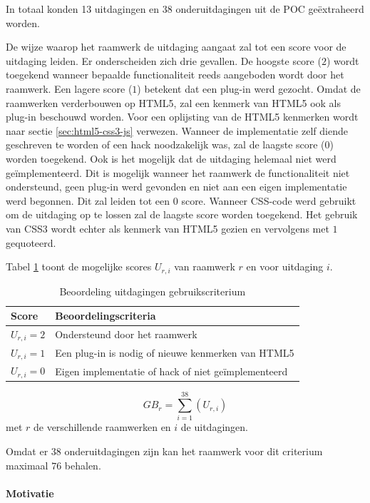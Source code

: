 In totaal konden 13 uitdagingen en 38 onderuitdagingen uit de POC geëxtraheerd worden.


De wijze waarop het raamwerk de uitdaging aangaat zal tot een score voor de uitdaging leiden.
Er onderscheiden zich drie gevallen.
De hoogste score ($2$) wordt toegekend wanneer bepaalde functionaliteit reeds aangeboden wordt door het raamwerk. 
Een lagere score ($1$) betekent dat een plug-in werd gezocht.
Omdat de raamwerken verderbouwen op HTML5, zal een kenmerk van HTML5 ook als plug-in beschouwd worden.
Voor een oplijsting van de HTML5 kenmerken wordt naar sectie \ref{sec:html5-css3-js} verwezen.
Wanneer de implementatie zelf diende geschreven te worden of een hack noodzakelijk was, zal de laagste score ($0$) worden toegekend.
Ook is het mogelijk  dat de uitdaging helemaal niet werd geïmplementeerd.
Dit is mogelijk wanneer het raamwerk de functionaliteit niet ondersteund,  geen plug-in werd gevonden en niet aan een eigen implementatie werd begonnen.
Dit zal leiden tot een $0$ score.
Wanneer CSS-code werd gebruikt om de uitdaging op te lossen zal de laagste score worden toegekend.
Het gebruik van CSS3 wordt echter als kenmerk van HTML5 gezien en vervolgens met $1$ gequoteerd.

Tabel \ref{tabel:scores-uitdagingen} toont de mogelijke scores $U_{r,i}$ van raamwerk $r$ en voor uitdaging $i$.
\begin{table}[h]	
  \centering
  \begin{tabular}{ll}
    \toprule
    \textbf{Score} & \textbf{Beoordelingscriteria}\\
    \midrule
    $U_{r,i} = 2$ & Ondersteund door het raamwerk\\
    $U_{r,i} = 1$ & Een plug-in is nodig of nieuwe kenmerken van HTML5\\
    $U_{r,i} = 0$ & Eigen implementatie of hack of niet geïmplementeerd\\ 
    \bottomrule
  \end{tabular}
  \caption{Beoordeling uitdagingen gebruikscriterium}
  \label{tabel:scores-uitdagingen}
\end{table}
\begin{equation}
  GB_r = \sum_{i=1}^{38}{\left(U_{r,i}\right)}
  \label{eq:gebruik}
\end{equation}
met $r$ de verschillende raamwerken en $i$ de uitdagingen.

Omdat er $38$ onderuitdagingen zijn kan het raamwerk voor dit criterium maximaal $76$ behalen.

\paragraph{Motivatie}

